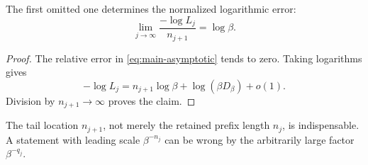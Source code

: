 \begin{corollary}
\label{cor:log-rigidity}
The first omitted one determines the normalized logarithmic error:
\begin{equation}
 \lim_{j\to\infty}\frac{-\log L_j}{n_{j+1}}=\log\beta.
 \label{eq:normalized-log}
\end{equation}
\end{corollary}

\begin{proof}
The relative error in \eqref{eq:main-asymptotic} tends to zero.  Taking logarithms gives
\[
 -\log L_j=n_{j+1}\log\beta+\log(\beta D_\beta)+o(1).
\]
Division by $n_{j+1}\to\infty$ proves the claim.
\end{proof}

\begin{remark}
The tail location $n_{j+1}$, not merely the retained prefix length $n_j$, is indispensable.  A statement with leading scale $\beta^{-n_j}$ can be wrong by the arbitrarily large factor $\beta^{-q_j}$.
\end{remark}
